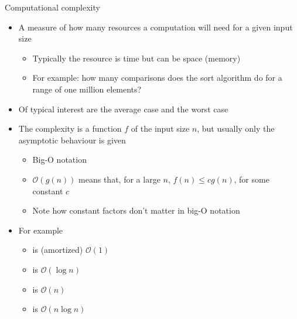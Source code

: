 \begin{frame}{Computational complexity}

  \begin{itemize}
  \item<1-> A measure of how many resources a computation will need for a given
    input size
    \begin{itemize}
    \item Typically the resource is time but can be space (memory)
    \item For example: how many comparisons does the sort algorithm do for a
      range of one million elements?
    \end{itemize}
  \item<1-> Of typical interest are the average case and the worst case
  \item<2-> The complexity is a function $f$ of the input size $n$, but usually only
    the asymptotic behaviour is given
    \begin{itemize}
    \item Big-O notation
    \item $\mathcal{O}(g(n))$ means that, for a large $n$,
      $f(n) \le cg(n)$, for some constant $c$
    \item Note how constant factors don't matter in big-O notation
    \end{itemize}
  \item<3-> For example
    \begin{itemize}
    \item {} is (amortized) $\mathcal{O}(1)$
    \item {} is $\mathcal{O}(\log{}n)$
    \item {} is $\mathcal{O}(n)$
    \item {} is $\mathcal{O}(n\log{}n)$
    \end{itemize}
  \end{itemize}
\end{frame}

